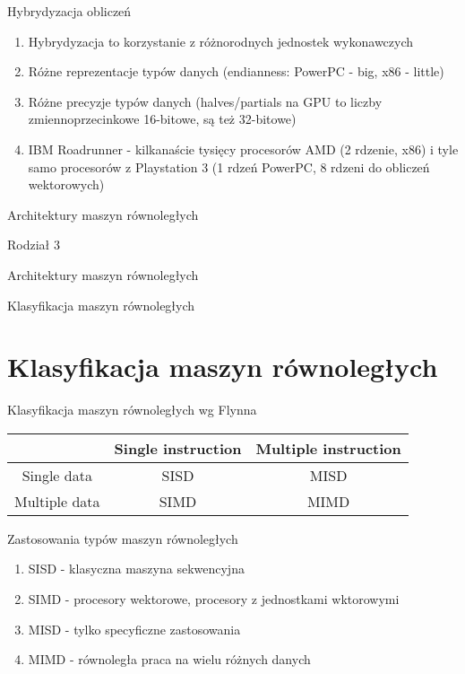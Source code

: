 \documentclass{beamer}
\begin{document}
\begin{frame}{Hybrydyzacja obliczeń}
  \begin{enumerate}
  \item Hybrydyzacja to korzystanie z różnorodnych jednostek wykonawczych
  \item Różne reprezentacje typów danych (endianness: PowerPC - big, x86 - little)
  \item Różne precyzje typów danych (halves/partials na GPU to liczby zmiennoprzecinkowe 16-bitowe, są też 32-bitowe)
  \item IBM Roadrunner - kilkanaście tysięcy procesorów AMD (2 rdzenie, x86) i tyle samo procesorów z Playstation 3 (1 rdzeń PowerPC, 8 rdzeni do obliczeń wektorowych)
  \end{enumerate}
\end{frame}

\begin{frame}{Architektury maszyn równoległych}
  \huge
  \begin{center}
    Rodział 3

    Architektury maszyn równoległych

    \large

    Klasyfikacja maszyn równoległych
  \end{center}
\end{frame}

\section{Klasyfikacja maszyn równoległych}

\begin{frame}{Klasyfikacja maszyn równoległych wg Flynna}
  \begin{tabular}{ | c | c | c | }
    \hline
    & Single instruction & Multiple instruction \\
    \hline
    Single data   & SISD               & MISD                 \\
    \hline
    Multiple data & SIMD               & MIMD                 \\
    \hline
  \end{tabular}
\end{frame}

\begin{frame}{Zastosowania typów maszyn równoległych}
  \begin{enumerate}
  \item SISD - klasyczna maszyna sekwencyjna
  \item SIMD - procesory wektorowe, procesory z jednostkami wktorowymi
  \item MISD - tylko specyficzne zastosowania
  \item MIMD - równoległa praca na wielu różnych danych
  \end{enumerate}
\end{frame}
\end{document}
